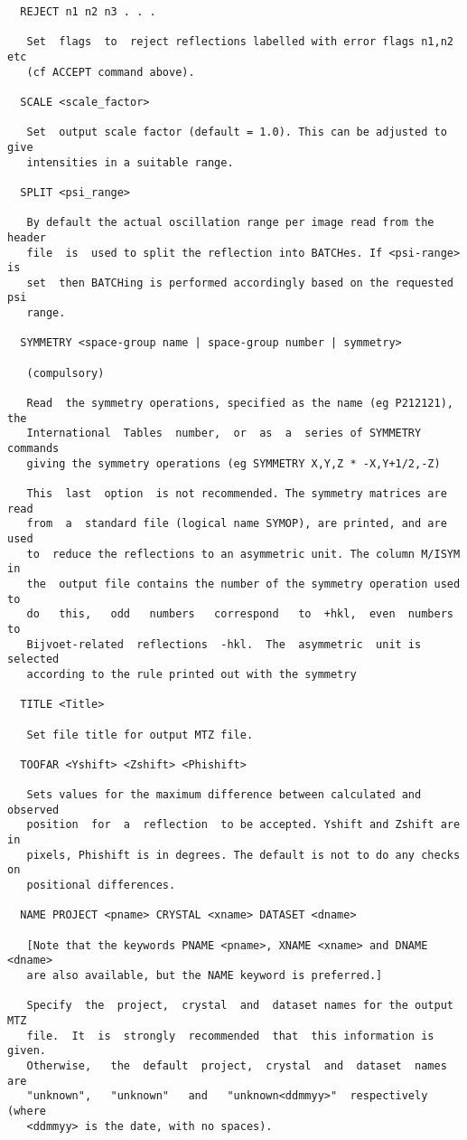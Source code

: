 \documentclass[a4paper, 11pt]{article}
\begin{document}
{\begin{verbatim}
  REJECT n1 n2 n3 . . .

   Set  flags  to  reject reflections labelled with error flags n1,n2 etc
   (cf ACCEPT command above).

  SCALE <scale_factor>

   Set  output scale factor (default = 1.0). This can be adjusted to give
   intensities in a suitable range.

  SPLIT <psi_range>

   By default the actual oscillation range per image read from the header
   file  is  used to split the reflection into BATCHes. If <psi-range> is
   set  then BATCHing is performed accordingly based on the requested psi
   range.

  SYMMETRY <space-group name | space-group number | symmetry>

   (compulsory)

   Read  the symmetry operations, specified as the name (eg P212121), the
   International  Tables  number,  or  as  a  series of SYMMETRY commands
   giving the symmetry operations (eg SYMMETRY X,Y,Z * -X,Y+1/2,-Z)

   This  last  option  is not recommended. The symmetry matrices are read
   from  a  standard file (logical name SYMOP), are printed, and are used
   to  reduce the reflections to an asymmetric unit. The column M/ISYM in
   the  output file contains the number of the symmetry operation used to
   do   this,   odd   numbers   correspond   to  +hkl,  even  numbers  to
   Bijvoet-related  reflections  -hkl.  The  asymmetric  unit is selected
   according to the rule printed out with the symmetry

  TITLE <Title>

   Set file title for output MTZ file.

  TOOFAR <Yshift> <Zshift> <Phishift>

   Sets values for the maximum difference between calculated and observed
   position  for  a  reflection  to be accepted. Yshift and Zshift are in
   pixels, Phishift is in degrees. The default is not to do any checks on
   positional differences.

  NAME PROJECT <pname> CRYSTAL <xname> DATASET <dname>

   [Note that the keywords PNAME <pname>, XNAME <xname> and DNAME <dname>
   are also available, but the NAME keyword is preferred.]

   Specify  the  project,  crystal  and  dataset names for the output MTZ
   file.  It  is  strongly  recommended  that  this information is given.
   Otherwise,   the  default  project,  crystal  and  dataset  names  are
   "unknown",   "unknown"   and   "unknown<ddmmyy>"  respectively  (where
   <ddmmyy> is the date, with no spaces).


\end{verbatim}}
\end{document}
